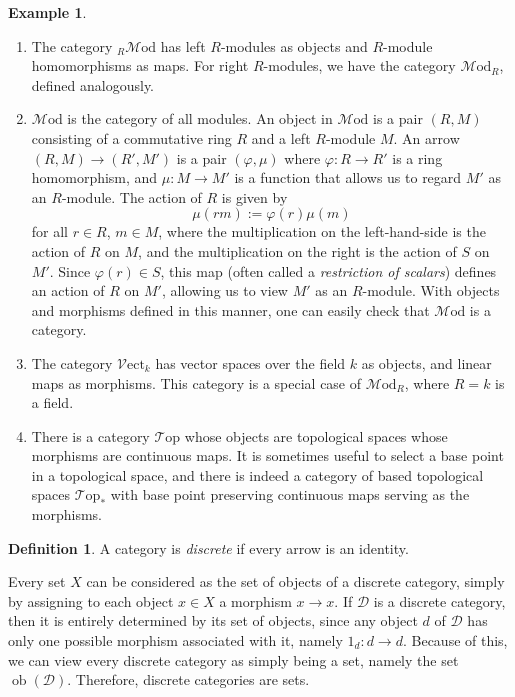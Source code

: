 \documentclass[10pt,oneside]{book}
\def\~#1{\mathscr{#1}}
\newcommand{\ob}{\mathop{\mathrm{ob}}}
\newcommand{\Mod}{\~M\mathrm{od}}
\newcommand{\Vect}{\~V\mathrm{ect}}
\newcommand{\Top}{\~T\mathrm{op}}
\newcommand{\vp}{\varphi}
\theoremstyle{plain}
\theoremstyle{definition}
\newtheorem{defn}[thm]{Definition}
\newtheorem{ex}[thm]{Example}
\theoremstyle{remark}
\numberwithin{equation}{section}
\numberwithin{figure}{section}
\begin{document}
\begin{ex}
\begin{enumerate}[label=(\roman*)]
        \item The category $_R\Mod$ has left $R$-modules as objects and $R$-module homomorphisms as maps. For right $R$-modules, we have the category $\Mod_R$, defined analogously. 
        
        \item $\Mod$ is the category of all modules. An object in $\Mod$ is a pair $(R, M)$ consisting of a commutative ring $R$ and a left $R$-module $M$. An arrow $(R, M) \to (R', M')$ is a pair $(\vp, \mu)$ where $\vp: R \to R'$ is a ring homomorphism, and $\mu: M \to M'$ is a function that allows us to regard $M'$ as an $R$-module. The action of $R$ is given by
        \[\mu(r m) := \vp(r) \mu(m)\]
        for all $r \in R$, $m \in M$, where the multiplication on the left-hand-side is the action of $R$ on $M$, and the multiplication on the right is the action of $S$ on $M'$. Since $\vp(r) \in S$, this map (often called a \emph{restriction of scalars}) defines an action of $R$ on $M'$, allowing us to view $M'$ as an $R$-module. With objects and morphisms defined in this manner, one can easily check that $\Mod$ is a category.
        
        \item The category $\Vect_k$ has vector spaces over the field $k$ as objects, and linear maps as morphisms. This category is a special case of $\Mod_R$, where $R = k$ is a field.
        
        \item There is a category $\Top$ whose objects are topological spaces whose morphisms are continuous maps. It is sometimes useful to select a base point in a topological space, and there is indeed a category of based topological spaces $\Top_\ast$ with base point preserving continuous maps serving as the morphisms.
    \end{enumerate}
\end{ex}

\begin{defn}
    A category is \emph{discrete} if every arrow is an identity. 
\end{defn}

Every set $X$ can be considered as the set of objects of a discrete category, simply by assigning to each object $x \in X$ a morphism $x \to x$. If $\~D$ is a discrete category, then it is entirely determined by its set of objects, since any object $d$ of $\~D$ has only one possible morphism associated with it, namely $1_d: d \to d$. Because of this, we can view every discrete category as simply being a set, namely the set $\ob(\~D)$. Therefore, discrete categories are sets.
\end{document}
